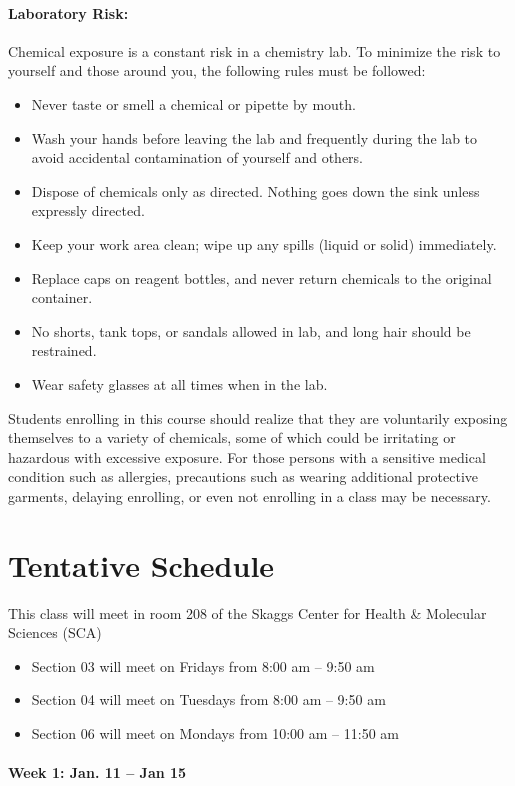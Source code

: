 \documentclass[12pt, letterpaper]{article}
\begin{document}
\paragraph{Laboratory Risk:}
Chemical exposure is a constant risk in a chemistry lab. To minimize the risk to yourself and those around you, the following rules must be followed:
\begin{itemize}
	\item Never taste or smell a chemical or pipette by mouth.
	\item Wash your hands before leaving the lab and frequently during the lab to avoid accidental contamination of yourself and others.
	\item Dispose of chemicals only as directed. Nothing goes down the sink unless expressly directed.
	\item Keep your work area clean; wipe up any spills (liquid or solid) immediately.
	\item Replace caps on reagent bottles, and never return chemicals to the original container.
	\item No shorts, tank tops, or sandals allowed in lab, and long hair should be restrained.
	\item Wear safety glasses at all times when in the lab.
\end{itemize}
Students enrolling in this course should realize that they are voluntarily exposing themselves to a variety of chemicals, some of which could be irritating or hazardous with excessive exposure.  For those persons with a sensitive medical condition such as allergies, precautions such as wearing additional protective garments, delaying enrolling, or even not enrolling in a class may be necessary.

\newpage

\section*{Tentative Schedule}
This class will meet in room 208 of the Skaggs Center for Health \& Molecular Sciences (SCA)
\begin{itemize}
	\item Section 03 will meet on Fridays from 8:00 am – 9:50 am
	\item Section 04 will meet on Tuesdays from 8:00 am – 9:50 am
	\item Section 06 will meet on Mondays from 10:00 am – 11:50 am
\end{itemize}

\paragraph*{Week 1: Jan. 11 -- Jan 15}~
\end{document}
